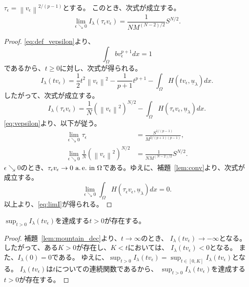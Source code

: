 \begin{lem} \label{lem:tauepsilon}
 $\tau_\epsilon = \left\| v_\epsilon \right\|^{2/(p-1)}$とする。
 このとき、次式が成立する。
 \begin{equation}
  \lim_{\epsilon \searrow 0} I_\lambda (\tau_\epsilon v_\epsilon) = 
   \frac{1}{NM^{(N-2)/2}} S^{N/2}. \label{eq:limI}
 \end{equation}
\end{lem}

\begin{proof}
 \eqref{eq:def_vepsilon}より、
 \[
  \int_\Omega bv_\epsilon^{p+1} dx = 1
 \]
 であるから、$t \geq 0$に対し、次式が得られる。
 \[
  I_\lambda(tv_\epsilon) = \frac{1}{2} t^2 \left\| v_\epsilon
 \right\|^2 - \frac{1}{p+1} t^{p+1} - \int_\Omega H(tv_\epsilon,
 \underline{u}_\lambda) dx.
 \]
 したがって、次式が成立する。
 \[
  I_\lambda(\tau_\epsilon v_\epsilon) = \frac{1}{N} \left( \left\|
 v_\epsilon \right\|^2 \right)^{N/2} - \int_\Omega H(\tau_\epsilon
 v_\epsilon, \underline{u}_\lambda) dx.
 \]
 \eqref{eq:vepsilon}より、以下が従う。
 \begin{align*}
  \lim_{\epsilon \searrow 0} \tau_\epsilon
  &= \frac{S^{1/(p-1)}}{M^{2/(p+1)(p-1)}}, \\
  \lim_{\epsilon \searrow 0} \frac{1}{N} \left( \left\|
 v_\epsilon \right\|^2 \right)^{N/2} &= \frac{1}{NM^{(N-2)/2}}
  S^{N/2}.
 \end{align*}
 $\epsilon \searrow 0$のとき、$\tau_\epsilon v_\epsilon \to 0 ~\text{a.\,e.}~
 \text{in}~ \Omega$である。ゆえに、補題~\ref{lem:conv}より、次式が成立する。
 \[
  \lim_{\epsilon \searrow 0} \int_\Omega H(\tau_\epsilon
 v_\epsilon, \underline{u}_\lambda) dx = 0.
 \]
 以上より、\eqref{eq:limI}が得られる。\qedhere
\end{proof}

\begin{lem} \label{lem:t_epsilon}
$\sup_{t > 0} I_\lambda (tv_\epsilon)$を達成する$t > 0$が存在する。
\end{lem}

\begin{proof}
補題~\ref{lem:mountain_dec}より、$t \to \infty$のとき、
$I_\lambda(t v_\epsilon) \to -\infty$となる。
したがって、ある$K>0$が存在し、$K < t$においては、
$I_\lambda(t v_\epsilon) < 0$となる。
また、$I_\lambda(0) = 0$である。
ゆえに、$\sup_{t > 0} I_\lambda (tv_\epsilon) = 
\sup_{t \in [0, K]} I_\lambda (tv_\epsilon)$となる。
$I_\lambda(tv_\epsilon)$は$t$についての連続関数であるから、
$\sup_{t > 0} I_\lambda (tv_\epsilon)$を達成する$t > 0$が存在する。\qedhere
\end{proof}

